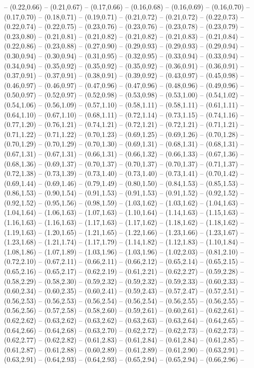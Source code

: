 {-- (0.22,0.66) -- (0.21,0.67) -- (0.17,0.66) -- (0.16,0.68) -- (0.16,0.69) -- (0.16,0.70) -- (0.17,0.70) -- (0.18,0.71) -- (0.19,0.71) -- (0.21,0.72) -- (0.21,0.72) -- (0.22,0.73) -- (0.22,0.74) -- (0.22,0.75) -- (0.23,0.76) -- (0.23,0.76) -- (0.23,0.78) -- (0.23,0.79) -- (0.23,0.80) -- (0.21,0.81) -- (0.21,0.82) -- (0.21,0.82) -- (0.21,0.83) -- (0.21,0.84) -- (0.22,0.86) -- (0.23,0.88) -- (0.27,0.90) -- (0.29,0.93) -- (0.29,0.93) -- (0.29,0.94) -- (0.30,0.94) -- (0.30,0.94) -- (0.31,0.95) -- (0.32,0.95) -- (0.33,0.94) -- (0.33,0.94) -- (0.34,0.94) -- (0.35,0.92) -- (0.35,0.92) -- (0.35,0.92) -- (0.36,0.91) -- (0.36,0.91) -- (0.37,0.91) -- (0.37,0.91) -- (0.38,0.91) -- (0.39,0.92) -- (0.43,0.97) -- (0.45,0.98) -- (0.46,0.97) -- (0.46,0.97) -- (0.47,0.96) -- (0.47,0.96) -- (0.48,0.96) -- (0.49,0.96) -- (0.50,0.97) -- (0.52,0.97) -- (0.52,0.98) -- (0.53,0.98) -- (0.53,1.00) -- (0.54,1.02) -- (0.54,1.06) -- (0.56,1.09) -- (0.57,1.10) -- (0.58,1.11) -- (0.58,1.11) -- (0.61,1.11) -- (0.64,1.10) -- (0.67,1.10) -- (0.68,1.11) -- (0.72,1.14) -- (0.73,1.15) -- (0.74,1.16) -- (0.77,1.20) -- (0.76,1.21) -- (0.74,1.21) -- (0.72,1.21) -- (0.72,1.21) -- (0.71,1.21) -- (0.71,1.22) -- (0.71,1.22) -- (0.70,1.23) -- (0.69,1.25) -- (0.69,1.26) -- (0.70,1.28) -- (0.70,1.29) -- (0.70,1.29) -- (0.70,1.30) -- (0.69,1.31) -- (0.68,1.31) -- (0.68,1.31) -- (0.67,1.31) -- (0.67,1.31) -- (0.66,1.31) -- (0.66,1.32) -- (0.66,1.33) -- (0.67,1.36) -- (0.68,1.36) -- (0.69,1.37) -- (0.70,1.37) -- (0.70,1.37) -- (0.70,1.37) -- (0.71,1.37) -- (0.72,1.38) -- (0.73,1.39) -- (0.73,1.40) -- (0.73,1.40) -- (0.73,1.41) -- (0.70,1.42) -- (0.69,1.44) -- (0.69,1.46) -- (0.79,1.49) -- (0.80,1.50) -- (0.84,1.53) -- (0.85,1.53) -- (0.86,1.53) -- (0.90,1.54) -- (0.91,1.53) -- (0.91,1.53) -- (0.91,1.52) -- (0.92,1.52) -- (0.92,1.52) -- (0.95,1.56) -- (0.98,1.59) -- (1.03,1.62) -- (1.03,1.62) -- (1.04,1.63) -- (1.04,1.64) -- (1.06,1.63) -- (1.07,1.63) -- (1.10,1.64) -- (1.14,1.63) -- (1.15,1.63) -- (1.16,1.63) -- (1.16,1.63) -- (1.17,1.63) -- (1.17,1.62) -- (1.18,1.62) -- (1.18,1.62) -- (1.19,1.63) -- (1.20,1.65) -- (1.21,1.65) -- (1.22,1.66) -- (1.23,1.66) -- (1.23,1.67) -- (1.23,1.68) -- (1.21,1.74) -- (1.17,1.79) -- (1.14,1.82) -- (1.12,1.83) -- (1.10,1.84) -- (1.08,1.86) -- (1.07,1.89) -- (1.03,1.96) -- (1.03,1.96) -- (1.02,2.03) -- (0.81,2.10) -- (0.72,2.10) -- (0.67,2.11) -- (0.66,2.11) -- (0.66,2.12) -- (0.65,2.14) -- (0.65,2.15) -- (0.65,2.16) -- (0.65,2.17) -- (0.62,2.19) -- (0.61,2.21) -- (0.62,2.27) -- (0.59,2.28) -- (0.58,2.29) -- (0.58,2.30) -- (0.59,2.32) -- (0.59,2.32) -- (0.59,2.33) -- (0.60,2.33) -- (0.60,2.34) -- (0.60,2.35) -- (0.60,2.41) -- (0.59,2.43) -- (0.57,2.47) -- (0.57,2.51) -- (0.56,2.53) -- (0.56,2.53) -- (0.56,2.54) -- (0.56,2.54) -- (0.56,2.55) -- (0.56,2.55) -- (0.56,2.56) -- (0.57,2.58) -- (0.58,2.60) -- (0.59,2.61) -- (0.60,2.61) -- (0.62,2.61) -- (0.62,2.62) -- (0.63,2.62) -- (0.63,2.62) -- (0.63,2.63) -- (0.63,2.64) -- (0.64,2.65) -- (0.64,2.66) -- (0.64,2.68) -- (0.63,2.70) -- (0.62,2.72) -- (0.62,2.73) -- (0.62,2.73) -- (0.62,2.77) -- (0.62,2.82) -- (0.61,2.83) -- (0.61,2.84) -- (0.61,2.84) -- (0.61,2.85) -- (0.61,2.87) -- (0.61,2.88) -- (0.60,2.89) -- (0.61,2.89) -- (0.61,2.90) -- (0.63,2.91) -- (0.63,2.91) -- (0.64,2.93) -- (0.64,2.93) -- (0.65,2.94) -- (0.65,2.94) -- (0.66,2.96) -- }

